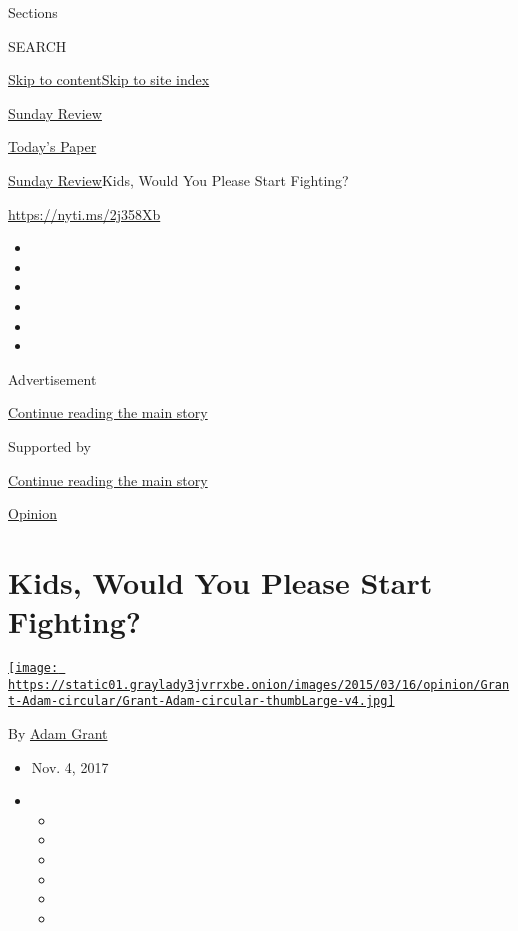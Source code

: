 Sections

SEARCH

\protect\hyperlink{site-content}{Skip to
content}\protect\hyperlink{site-index}{Skip to site index}

\href{https://www.nytimes3xbfgragh.onion/section/opinion/sunday}{Sunday
Review}

\href{https://myaccount.nytimes3xbfgragh.onion/auth/login?response_type=cookie\&client_id=vi}{}

\href{https://www.nytimes3xbfgragh.onion/section/todayspaper}{Today's
Paper}

\href{/section/opinion/sunday}{Sunday Review}\textbar{}Kids, Would You
Please Start Fighting?

\url{https://nyti.ms/2j358Xb}

\begin{itemize}
\item
\item
\item
\item
\item
\item
\end{itemize}

Advertisement

\protect\hyperlink{after-top}{Continue reading the main story}

Supported by

\protect\hyperlink{after-sponsor}{Continue reading the main story}

\href{/section/opinion}{Opinion}

\hypertarget{kids-would-you-please-start-fighting}{%
\section{Kids, Would You Please Start
Fighting?}\label{kids-would-you-please-start-fighting}}

\href{https://www.nytimes3xbfgragh.onion/column/adam-grant}{\texttt{[image: https://static01.graylady3jvrrxbe.onion/images/2015/03/16/opinion/Grant-Adam-circular/Grant-Adam-circular-thumbLarge-v4.jpg]}}

By \href{https://www.nytimes3xbfgragh.onion/column/adam-grant}{Adam
Grant}

\begin{itemize}
\item
  Nov. 4, 2017
\item
  \begin{itemize}
  \item
  \item
  \item
  \item
  \item
  \item
  \end{itemize}
\end{itemize}

